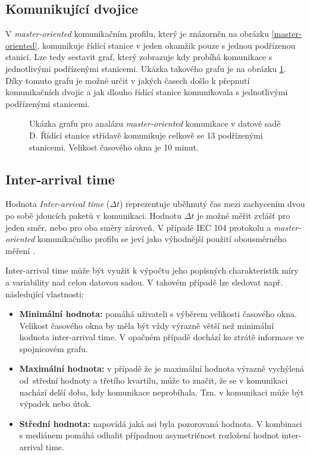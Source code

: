 \subsection{Komunikující dvojice}
\label{master-orinted_plot}

V \emph{master-oriented} komunikačním profilu, který je znázorněn na obrázku \ref{master-oriented}, komunikuje řídící stanice v jeden okamžik pouze s jednou podřízenou stanicí. Lze tedy sestavit graf, který zobrazuje kdy probíhá komunikace s jednotlivými podřízenými stanicemi. Ukázka takového grafu je na obrázku \ref{graph3}. Díky tomuto grafu je možné určit v jakých časech došlo k přepnutí komunikačních dvojic a jak dlouho řídící stanice komunikovala s jednotlivými podřízenými stanicemi.

\begin{figure}[H]
	\centering
	\resizebox{1\textwidth}{!}
    {
        
    }
    \caption{Ukázka grafu pro analázu \emph{master-oriented} komunikace v datové sadě D. Řídící stanice střídavě komunikuje celkově se 13 podřízenými stanicemi. Velikost časového okna je 10 minut.}
	\label{graph3}
\end{figure}

\subsection{Inter-arrival time}
\label{inter-arrival_time}

Hodnota \emph{Inter-arrival time} ($\Delta t$) reprezentuje uběhnutý čas mezi zachycením dvou po sobě jdoucích paketů v komunikaci. Hodnotu $\Delta t$ je možné měřit zvlášť pro jeden směr, nebo pro oba směry zároveň. V případě IEC 104 protokolu a \emph{master-oriented} komunikačního profilu se jeví jako výhodnější použití obousměrného měření \cite{anomaly_detection_ics}.

Inter-arrival time může být využit k výpočtu jeho popisných charakteristik míry a variability nad celou datovou sadou. V takovém případě lze sledovat např. následující vlastnosti:

\begin{itemize}
    \item \textbf{Minimální hodnota:} pomáhá uživateli s výběrem velikosti časového okna. Velikost časového okna by měla být vždy výrazně větší než minimální hodnota inter-arrival time. V opačném případě dochází ke ztrátě informace ve spojnicovém grafu. 
    \item \textbf{Maximální hodnota:} v případě že je maximální hodnota výrazně vychýlená od~střední hodnoty a třetího kvartilu, může to značit, že se v komunikaci nachází delší doba, kdy komunikace neprobíhala. Tzn. v komunikaci může být výpadek nebo útok.
    \item \textbf{Střední hodnota:} napovídá jaká asi byla  pozorovaná hodnota. V kombinaci s mediánem pomáhá odhalit případnou asymetričnost rozložení hodnot inter-arrival time.
\end{itemize}


